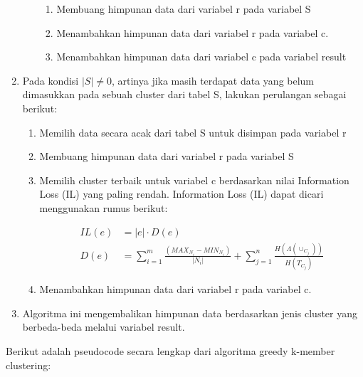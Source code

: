 \begin{enumerate}
\begin{enumerate}
\begin{enumerate}
\item Membuang himpunan data dari variabel r pada variabel S

\item Menambahkan himpunan data dari variabel r pada variabel c.

\item Menambahkan himpunan data dari variabel c pada variabel result

\end{enumerate}

\end{enumerate}

\item Pada kondisi $|S| \neq  0$, artinya jika masih terdapat data yang belum dimasukkan pada sebuah cluster dari tabel S, lakukan perulangan sebagai berikut:

\begin{enumerate}
\item Memilih data secara acak dari tabel S untuk disimpan pada variabel r

\item Membuang himpunan data dari variabel r pada variabel S

\item Memilih cluster terbaik untuk variabel c berdasarkan nilai Information Loss (IL) yang paling rendah. Information Loss (IL) dapat dicari menggunakan rumus berikut:

\begin{align*}
IL(e)&= |e| \cdot D(e) \\
D(e) &= \sum_{i=1}^{m} \frac{(MAX_{N_i} - MIN_{N_i})}{|N_i|} + \sum_{j=1}^{n}\frac{H(\Lambda(\cup_{C_j}))}{H(T_{C_j})}
\end{align*}

\item Menambahkan himpunan data dari variabel r pada variabel c.

\end{enumerate}

\item Algoritma ini mengembalikan himpunan data berdasarkan jenis cluster yang berbeda-beda melalui variabel result.

\end{enumerate}

\newpage
\noindent Berikut adalah pseudocode secara lengkap dari algoritma greedy k-member clustering:


